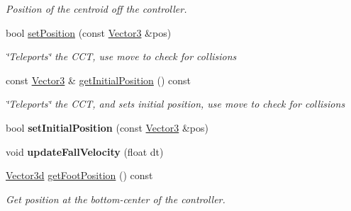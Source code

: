 \begin{Indent}
\begin{DoxyCompactItemize}
\begin{DoxyCompactList}\small\item\em Position of the centroid off the controller. \end{DoxyCompactList}\item 
\mbox{\label{classrev_1_1_character_controller_a82788f65ab5f2d9e60d5758493d0d946}} 
bool \mbox{\hyperlink{classrev_1_1_character_controller_a82788f65ab5f2d9e60d5758493d0d946}{set\+Position}} (const \mbox{\hyperlink{classrev_1_1_vector}{Vector3}} \&pos)
\begin{DoxyCompactList}\small\item\em \char`\"{}\+Teleports\char`\"{} the C\+CT, use move to check for collisions \end{DoxyCompactList}\item 
\mbox{\label{classrev_1_1_character_controller_ab76d8e954e2f8a3018d1a4c9696c3a9f}} 
const \mbox{\hyperlink{classrev_1_1_vector}{Vector3}} \& \mbox{\hyperlink{classrev_1_1_character_controller_ab76d8e954e2f8a3018d1a4c9696c3a9f}{get\+Initial\+Position}} () const
\begin{DoxyCompactList}\small\item\em \char`\"{}\+Teleports\char`\"{} the C\+CT, and sets initial position, use move to check for collisions \end{DoxyCompactList}\item 
\mbox{\label{classrev_1_1_character_controller_a821c726cac39ad3d688b10321484709c}} 
bool {\bfseries set\+Initial\+Position} (const \mbox{\hyperlink{classrev_1_1_vector}{Vector3}} \&pos)
\item 
\mbox{\label{classrev_1_1_character_controller_a6a7180230b996d5e19d81dc01678321a}} 
void {\bfseries update\+Fall\+Velocity} (float dt)
\item 
\mbox{\hyperlink{classrev_1_1_vector}{Vector3d}} \mbox{\hyperlink{classrev_1_1_character_controller_af8f6c4f320f1808326dc4b13b6c056d5}{get\+Foot\+Position}} () const
\begin{DoxyCompactList}\small\item\em Get position at the bottom-\/center of the controller. \end{DoxyCompactList}\item 

\end{DoxyCompactItemize}
\end{Indent}

